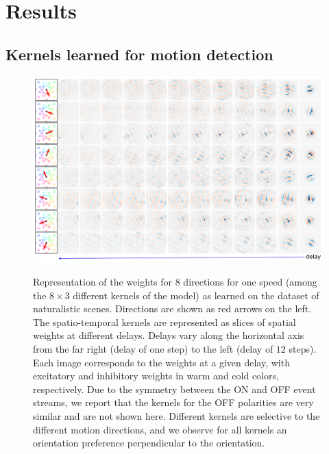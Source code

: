 \documentclass[default]{sn-jnl}%
\theoremstyle{thmstyleone}%
\theoremstyle{thmstyletwo}%
\theoremstyle{thmstylethree}%
\begin{document}
\section{Results}
\label{sec:results}
\subsection{Kernels learned for motion detection}
\begin{figure}[ht!]
    {\centering
    \includegraphics[width=\linewidth]{figures/motion_kernels.pdf}
    }
    \caption{
    	Representation of the weights for $8$ directions for one speed (among the $8 \times 3$ different kernels of the model) as learned on the dataset of naturalistic scenes. Directions are shown as red arrows on the left. The spatio-temporal kernels are represented as slices of spatial weights at different delays. Delays vary along the horizontal axis from the far right (delay of one step) to the left (delay of $12$ steps). Each image corresponds to the weights at a given delay, with excitatory and inhibitory weights in warm and cold colors, respectively. Due to the symmetry between the ON and OFF event streams, we report that the kernels for the OFF polarities are very similar and are not shown here.	Different kernels are selective to the different motion directions, and we observe for all kernels an orientation preference perpendicular to the orientation. 
	}
    \label{fig:kernels}
\end{figure} 
\end{document}
